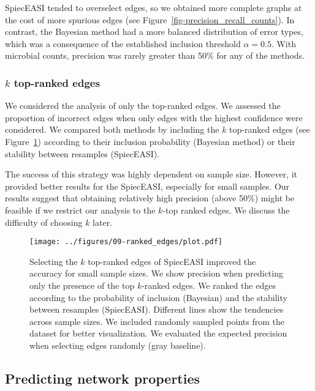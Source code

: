 \documentclass[
  a4paper,
]{article}
\begin{document}
SpiecEASI tended to overselect edges, so we obtained more complete
graphs at the cost of more spurious edges (see
Figure~\ref{fig-precision_recall_counts}). In contrast, the Bayesian
method had a more balanced distribution of error types, which was a
consequence of the established inclusion threshold \(\alpha=0.5\). With
microbial counts, precision was rarely greater than 50\% for any of the
methods.

\hypertarget{k-top-ranked-edges}{%
\subsubsection{\texorpdfstring{\(k\) top-ranked
edges}{k top-ranked edges}}\label{k-top-ranked-edges}}

We considered the analysis of only the top-ranked edges. We assessed the
proportion of incorrect edges when only edges with the highest
confidence were considered. We compared both methods by including the
\(k\) top-ranked edges (see Figure~\ref{fig-ranked}) according to their
inclusion probability (Bayesian method) or their stability between
resamples (SpiecEASI).

The success of this strategy was highly dependent on sample size.
However, it provided better results for the SpiecEASI, especially for
small samples. Our results suggest that obtaining relatively high
precision (above 50\%) might be feasible if we restrict our analysis to
the \(k\)-top ranked edges. We discuss the difficulty of choosing \(k\)
later.

\begin{figure}

{\centering \texttt{[image: ../figures/09-ranked\_edges/plot.pdf]}

}

\caption{\label{fig-ranked}Selecting the \(k\) top-ranked edges of
SpiecEASI improved the accuracy for small sample sizes. We show
precision when predicting only the presence of the top \(k\)-ranked
edges. We ranked the edges according to the probability of inclusion
(Bayesian) and the stability between resamples (SpiecEASI). Different
lines show the tendencies across sample sizes. We included randomly
sampled points from the dataset for better visualization. We evaluated
the expected precision when selecting edges randomly (gray baseline).}

\end{figure}

\hypertarget{predicting-network-properties}{%
\subsection{Predicting network
properties}\label{predicting-network-properties}}
\end{document}
